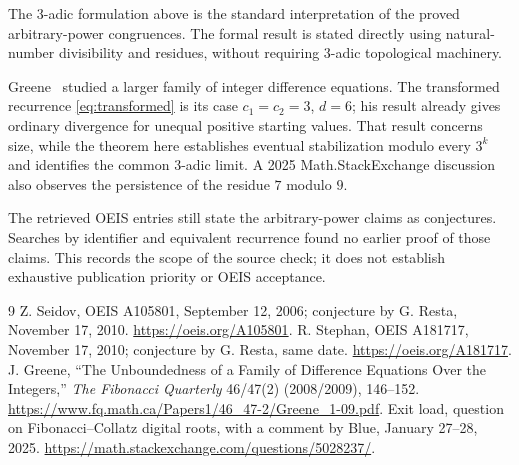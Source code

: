 \documentclass[11pt]{article}
\begin{document}
The $3$-adic formulation above is the standard interpretation of the proved
arbitrary-power congruences. The formal result is stated directly using
natural-number divisibility and residues, without requiring $3$-adic
topological machinery.

Greene~\cite{Greene} studied a larger family of integer difference equations.
The transformed recurrence \eqref{eq:transformed} is its case
$c_1=c_2=3$, $d=6$; his result already gives ordinary divergence for unequal
positive starting values. That result concerns size, while the theorem here
establishes eventual stabilization modulo every $3^k$ and identifies the
common $3$-adic limit. A 2025 Math.StackExchange discussion~\cite{MSE}
also observes the persistence of the residue $7$ modulo $9$.

The retrieved OEIS entries still state the arbitrary-power claims as
conjectures. Searches by identifier and equivalent recurrence found no
earlier proof of those claims. This records the scope of the source check;
it does not establish exhaustive publication priority or OEIS acceptance.

\begin{thebibliography}{9}
 Z. Seidov, OEIS A105801, September 12, 2006;
conjecture by G. Resta, November 17, 2010.
\url{https://oeis.org/A105801}.
 R. Stephan, OEIS A181717, November 17, 2010;
conjecture by G. Resta, same date.
\url{https://oeis.org/A181717}.
 J. Greene, ``The Unboundedness of a Family of Difference
Equations Over the Integers,'' \emph{The Fibonacci Quarterly} 46/47(2)
(2008/2009), 146--152.
\url{https://www.fq.math.ca/Papers1/46_47-2/Greene_1-09.pdf}.
 Exit load, question on Fibonacci--Collatz digital roots,
with a comment by Blue, January 27--28, 2025.
\url{https://math.stackexchange.com/questions/5028237/}.
\end{thebibliography}
\end{document}
